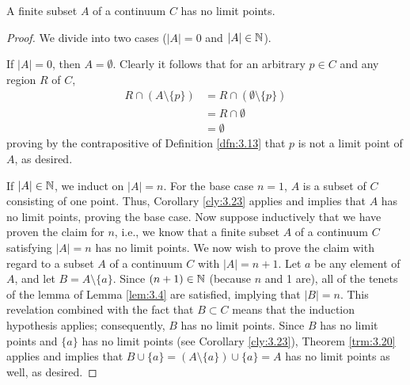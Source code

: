 \documentclass[../main.tex]{subfiles}
\begin{document}
\begin{theorem}\label{trm:3.24}
    A finite subset $A$ of a continuum $C$ has no limit points.
    \begin{proof}
        We divide into two cases ($|A|=0$ and $|A|\in\mathbb{N}$).\par
        If $|A|=0$, then $A=\emptyset$. Clearly it follows that for an arbitrary $p\in C$ and any region $R$ of $C$,
        \begin{align*}
            R\cap(A\setminus\{p\}) &= R\cap(\emptyset\setminus\{p\})\\
            &= R\cap\emptyset\\
            &= \emptyset
        \end{align*}
        proving by the contrapositive of Definition \ref{dfn:3.13} that $p$ is not a limit point of $A$, as desired.\par
        If $|A|\in\mathbb{N}$, we induct on $|A|=n$. For the base case $n=1$, $A$ is a subset of $C$ consisting of one point. Thus, Corollary \ref{cly:3.23} applies and implies that $A$ has no limit points, proving the base case. Now suppose inductively that we have proven the claim for $n$, i.e., we know that a finite subset $A$ of a continuum $C$ satisfying $|A|=n$ has no limit points. We now wish to prove the claim with regard to a subset $A$ of a continuum $C$ with $|A|=n+1$. Let $a$ be any element of $A$, and let $B=A\setminus\{a\}$. Since $(n+1)\in\mathbb{N}$ (because $n$ and 1 are), all of the tenets of the lemma of Lemma \ref{lem:3.4} are satisfied, implying that $|B|=n$. This revelation combined with the fact that $B\subset C$ means that the induction hypothesis applies; consequently, $B$ has no limit points. Since $B$ has no limit points and $\{a\}$ has no limit points (see Corollary \ref{cly:3.23}), Theorem \ref{trm:3.20} applies and implies that $B\cup\{a\}=(A\setminus\{a\})\cup\{a\}=A$ has no limit points as well, as desired.
    \end{proof}
\end{theorem}
\end{document}
